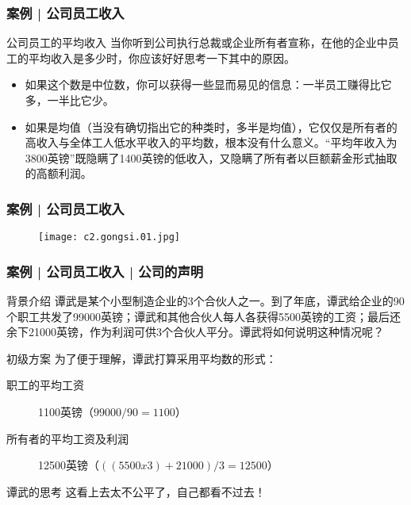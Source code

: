 \begin{frame}
  \frametitle{案例 | 公司员工收入}
  \begin{block}{公司员工的平均收入}
    当你听到公司执行总裁或企业所有者宣称，在他的企业中员工的平均收入是多少时，你应该好好思考一下其中的原因。
    \begin{itemize}
      \item 如果这个数是中位数，你可以获得一些显而易见的信息：一半员工赚得比它多，一半比它少。
      \item 如果是均值（当没有确切指出它的种类时，多半是均值），它仅仅是所有者的高收入与全体工人低水平收入的平均数，根本没有什么意义。“平均年收入为3800英镑”既隐瞒了1400英镑的低收入，又隐瞒了所有者以巨额薪金形式抽取的高额利润。
    \end{itemize}
  \end{block}
\end{frame}

\begin{frame}
  \frametitle{案例 | 公司员工收入}
  \begin{figure}
    \centering
    \texttt{[image: c2.gongsi.01.jpg]}
  \end{figure}
\end{frame}

\begin{frame}
  \frametitle{案例 | 公司员工收入 | 公司的声明}
  \begin{block}{背景介绍}
谭武是某个小型制造企业的3个合伙人之一。到了年底，谭武给企业的90个职工共发了99000英镑；谭武和其他合伙人每人各获得5500英镑的工资；最后还余下21000英镑，作为利润可供3个合伙人平分。谭武将如何说明这种情况呢？
  \end{block}
  \pause
  \begin{block}{初级方案}
    为了便于理解，谭武打算采用平均数的形式：
    \begin{description}
      \item[职工的平均工资] 1100英镑（$99000 / 90 = 1100$）
      \item[所有者的平均工资及利润] 12500英镑（$((5500 x 3) + 21000) / 3 = 12500$）
    \end{description}
  \end{block}
  \pause
  \begin{block}{谭武的思考}
    这看上去太不公平了，自己都看不过去！
  \end{block}
\end{frame}

